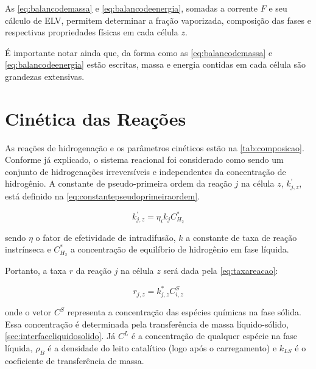 
As \autoref{eq:balancodemassa} e \autoref{eq:balancodeenergia}, somadas a
corrente $F$ e seu cálculo de ELV, permitem determinar a fração vaporizada,
composição das fases e respectivas propriedades físicas em cada célula $z$.

É importante notar ainda que, da forma como as \autoref{eq:balancodemassa} e
\autoref{eq:balancodeenergia} estão escritas, massa e energia contidas em cada
célula são grandezas extensivas. 

\section{Cinética das Reações} \label{sec:cineticadasreacoes}

As reações de hidrogenação e os parâmetros cinéticos estão na
\autoref{tab:composicao}. Conforme já explicado, o sistema reacional foi
considerado como sendo um conjunto de hidrogenações irreversíveis e
independentes da concentração de hidrogênio. A constante de pseudo-primeira
ordem da reação $j$ na célula $z$, $k^{'}_{j,z}$, está definido na
\autoref{eq:constantepseudoprimeiraordem}.

\begin{equation}
k^{'}_{j,z} = \eta_ik_jC^{*}_{H_2}
\label{eq:constantepseudoprimeiraordem}
\end{equation}

sendo $\eta$ o fator de efetividade de intradifusão, $k$ a
constante de taxa de reação instrínseca e $C^{*}_{H_2}$ a concentração de
equilíbrio de hidrogênio em fase líquida.


Portanto, a taxa $r$ da reação $j$ na célula $z$ será dada pela
\autoref{eq:taxareacao}:

\begin{equation}
r_{j,z} = k^{*}_{j,z}C^{S}_{i,z}
\label{eq:taxareacao}
\end{equation}

onde o vetor $C^{S}$ representa a concentração das espécies químicas na fase
sólida. Essa concentração é determinada pela transferência de massa
líquido-sólido, \autoref{sec:interfaceliquidosolido}. Já $C^{L}$ é a
concentração de qualquer espécie na fase líquida, $\rho_B$ é a densidade do
leito catalítico (logo após o carregamento) e $k_{LS}$ é o coeficiente de
transferência de massa.

